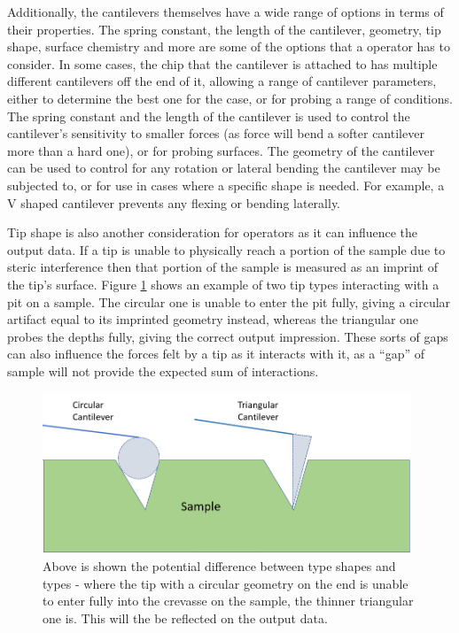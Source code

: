Additionally, the cantilevers themselves have a wide range of options in terms of their properties. The spring constant, the length of the cantilever, geometry, tip shape, surface chemistry and more are some of the options that a operator has to consider. In some cases, the chip that the cantilever is attached to has multiple different cantilevers off the end of it, allowing a range of cantilever parameters, either to determine the best one for the case, or for probing a range of conditions. The spring constant and the length of the cantilever is used to control the cantilever's sensitivity to smaller forces (as force will bend a softer cantilever more than a hard one), or for probing surfaces. The geometry of the cantilever can be used to control for any rotation or lateral bending the cantilever may be subjected to, or for use in cases where a specific shape is needed. For example, a V shaped cantilever prevents any flexing or bending laterally.

Tip shape is also another consideration for operators as it can influence the output data. If a tip is unable to physically reach a portion of the sample due to steric interference then that portion of the sample is measured as an imprint of the tip's surface. Figure \ref{fig:tipshape} shows an example of two tip types interacting with a pit on a sample. The circular one is unable to enter the pit fully, giving a circular artifact equal to its imprinted geometry instead, whereas the triangular one probes the depths fully, giving the correct output impression. These sorts of gaps can also influence the forces felt by a tip as it interacts with it, as a ``gap'' of sample will not provide the expected sum of interactions.

\begin{figure}[h!]     %
        \begin{center}
          \includegraphics[width=110mm]{chapter2/Tip Shapes.PNG}
\end{center}
\caption{Above is shown the potential difference between type shapes and types - where the tip with a circular geometry on the end is unable to enter fully into the crevasse on the sample, the thinner triangular one is. This will the be reflected on the output data.}
\label{fig:tipshape}                 %
\end{figure}


